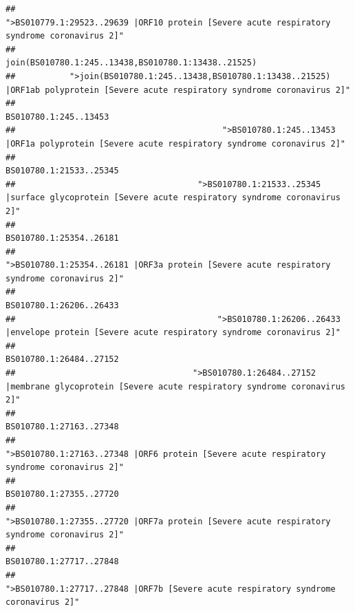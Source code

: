 \documentclass[
]{article}
\begin{document}
\begin{verbatim}
##                                            ">BS010779.1:29523..29639 |ORF10 protein [Severe acute respiratory syndrome coronavirus 2]" 
##                                                                                    join(BS010780.1:245..13438,BS010780.1:13438..21525) 
##           ">join(BS010780.1:245..13438,BS010780.1:13438..21525) |ORF1ab polyprotein [Severe acute respiratory syndrome coronavirus 2]" 
##                                                                                                                  BS010780.1:245..13453 
##                                          ">BS010780.1:245..13453 |ORF1a polyprotein [Severe acute respiratory syndrome coronavirus 2]" 
##                                                                                                                BS010780.1:21533..25345 
##                                     ">BS010780.1:21533..25345 |surface glycoprotein [Severe acute respiratory syndrome coronavirus 2]" 
##                                                                                                                BS010780.1:25354..26181 
##                                            ">BS010780.1:25354..26181 |ORF3a protein [Severe acute respiratory syndrome coronavirus 2]" 
##                                                                                                                BS010780.1:26206..26433 
##                                         ">BS010780.1:26206..26433 |envelope protein [Severe acute respiratory syndrome coronavirus 2]" 
##                                                                                                                BS010780.1:26484..27152 
##                                    ">BS010780.1:26484..27152 |membrane glycoprotein [Severe acute respiratory syndrome coronavirus 2]" 
##                                                                                                                BS010780.1:27163..27348 
##                                             ">BS010780.1:27163..27348 |ORF6 protein [Severe acute respiratory syndrome coronavirus 2]" 
##                                                                                                                BS010780.1:27355..27720 
##                                            ">BS010780.1:27355..27720 |ORF7a protein [Severe acute respiratory syndrome coronavirus 2]" 
##                                                                                                                BS010780.1:27717..27848 
##                                                    ">BS010780.1:27717..27848 |ORF7b [Severe acute respiratory syndrome coronavirus 2]" 

\end{verbatim}
\end{document}
